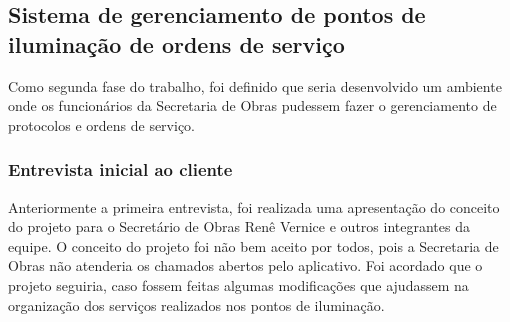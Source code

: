 \documentclass[
	article,			%
	11pt,				%
	oneside,			%
	a4paper,			%
	english,			%
	brazil,				%
	sumario=tradicional
	]{abntex2}
\begin{document}
\subsection{Sistema de gerenciamento de pontos de iluminação de ordens de serviço}

Como segunda fase do trabalho, foi definido que seria desenvolvido um ambiente onde os funcionários da Secretaria de Obras pudessem fazer o gerenciamento de protocolos e ordens de serviço.

\subsubsection{Entrevista inicial ao cliente}

Anteriormente a primeira entrevista, foi realizada uma apresentação do conceito do projeto para o Secretário de Obras Renê Vernice e outros integrantes da equipe.
O conceito do projeto foi não bem aceito por todos, pois a Secretaria de Obras não atenderia os chamados abertos pelo aplicativo.
Foi acordado que o projeto seguiria, caso fossem feitas algumas modificações que ajudassem na organização dos serviços realizados nos pontos de iluminação.
\end{document}
